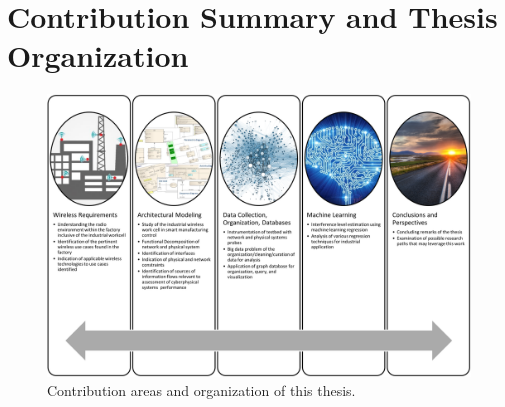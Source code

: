 {\begin{figure}[!tbp]
\end{figure}



%
%
%
%
%
%
%
%

\section{Contribution Summary and Thesis Organization}

\begin{figure}[!tbhp]
	\includegraphics{chapter-intro/images/contributions}
	\caption{Contribution areas and organization of this thesis.}
	\label{fig:intro:contr-org}
\end{figure}

}
